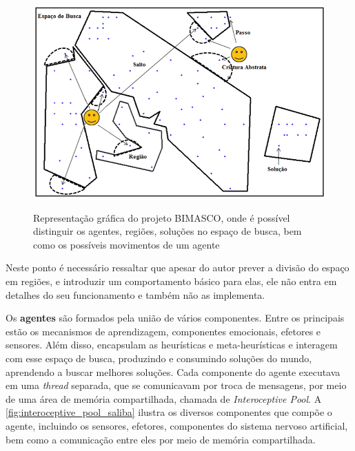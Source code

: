 \begin{figure}
    \centering
    \caption{Representação gráfica do projeto BIMASCO, onde é possível distinguir os agentes, regiões, soluções no espaço de busca, bem como os possíveis movimentos de um agente}
    \includegraphics[scale=0.45]{imagens/bimasco-saliba.png}
    \label{fig:bimasco_saliba}
\end{figure}


Neste ponto é necessário ressaltar que apesar do autor prever a divisão do espaço em regiões, e introduzir um comportamento básico para elas, ele não entra em detalhes do seu funcionamento e também não as implementa.

Os \textbf{agentes} são formados pela união de vários componentes. Entre os principais estão os mecanismos de aprendizagem, componentes emocionais, efetores e sensores. Além disso, encapsulam as heurísticas e meta-heurísticas e interagem com esse espaço de busca, produzindo e consumindo soluções do mundo, aprendendo a buscar melhores soluções. Cada componente do agente executava em uma \textit{thread} separada, que se comunicavam por troca de mensagens, por meio de uma área de memória compartilhada, chamada de \textit{Interoceptive Pool}. A \autoref{fig:interoceptive_pool_saliba} ilustra os diversos componentes que compõe o agente, incluindo os sensores, efetores, componentes do sistema nervoso artificial, bem como a comunicação entre eles por meio de memória compartilhada.

